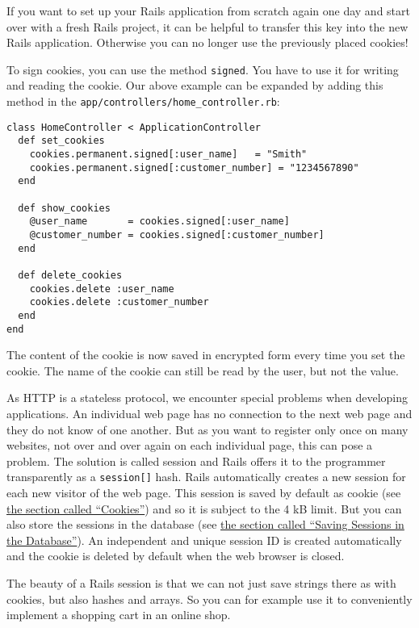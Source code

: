 \documentclass[a4paper]{book}
\newcounter{tab}[chapter]
\newcommand{\chap}[1]{\newpage\thispagestyle{empty}\chapter{#1}\label{chap:\thechapter}}
\begin{document}
If you want to set up your Rails application from scratch again one day and start over with a fresh Rails project, it can be helpful to transfer this key into the new Rails application. Otherwise you can no longer use the previously placed cookies!

To sign cookies, you can use the method \texttt{signed}. You have to use it for writing and reading the cookie. Our above example can be expanded by adding this method in the \texttt{app/controllers/home\_controller.rb}:

\begin{shaded}\begin{verbatim}
class HomeController < ApplicationController
  def set_cookies
    cookies.permanent.signed[:user_name]   = "Smith"
    cookies.permanent.signed[:customer_number] = "1234567890"
  end

  def show_cookies
    @user_name       = cookies.signed[:user_name]
    @customer_number = cookies.signed[:customer_number]
  end

  def delete_cookies
    cookies.delete :user_name
    cookies.delete :customer_number
  end
end
\end{verbatim}\end{shaded}

The content of the cookie is now saved in encrypted form every time you set the cookie. The name of the cookie can still be read by the user, but not the value.

\hyperdef{}{sessions}{\chap{Sessions}\label{sessions}}

As HTTP is a stateless protocol, we encounter special problems when developing applications. An individual web page has no connection to the next web page and they do not know of one another. But as you want to register only once on many websites, not over and over again on each individual page, this can pose a problem. The solution is called session and Rails offers it to the programmer transparently as a \texttt{session{[}{]}} hash. Rails automatically creates a new session for each new visitor of the web page. This session is saved by default as cookie (see \hyperref[cookies]{the section called “Cookies”}) and so it is subject to the 4 kB limit. But you can also store the sessions in the database (see \hyperref[sessionsux5fdatenbank]{the section called “Saving Sessions in the Database”}). An independent and unique session ID is created automatically and the cookie is deleted by default when the web browser is closed.

The beauty of a Rails session is that we can not just save strings there as with cookies, but also hashes and arrays. So you can for example use it to conveniently implement a shopping cart in an online shop.
\end{document}
